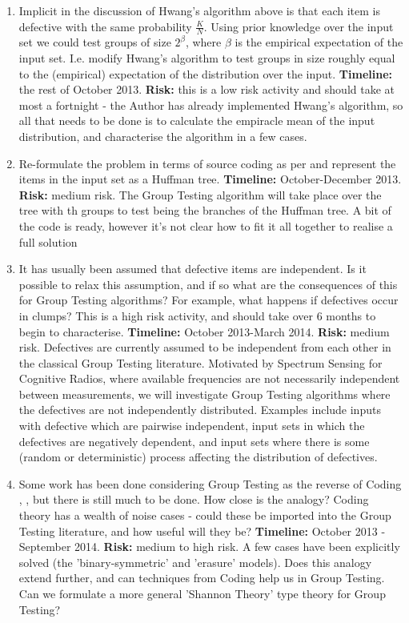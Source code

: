 \documentclass[12pt, a4paper]{article}
\begin{document}
\begin{enumerate}
\item Implicit in the discussion of Hwang's algorithm above is that each item is defective with the same probability \( \frac{K}{N} \). Using prior knowledge over the input set we could test groups of size \(2^\beta\), where \(\beta\) is the empirical expectation of the input set. I.e. modify Hwang's algorithm to test groups in size roughly equal to the (empirical) expectation of the distribution over the input. \textbf{Timeline:} the rest of October 2013. \textbf{Risk: } this is a low risk activity and should take at most a fortnight - the Author has already implemented Hwang's algorithm, so all that needs to be done is to calculate the empiracle mean of the input distribution, and characterise the algorithm in a few cases.

\item Re-formulate the problem in terms of source coding as per \cite{Aldroubi} and represent the items in the input set as a Huffman tree. \textbf{Timeline:} October-December 2013. \textbf{Risk: } medium risk. The Group Testing algorithm will take place over the tree with th groups to test being the branches of the Huffman tree. A bit of the code is ready, however it's not clear how to fit it all together to realise a full solution

\item It has usually been assumed that defective items are independent. Is it possible to relax this assumption, and if so what are the consequences of this for Group Testing algorithms? For example, what happens if defectives occur in clumps? This is a high risk activity, and should take over 6 months to begin to characterise. \textbf{Timeline: }
October 2013-March 2014. \textbf{Risk: } medium risk. Defectives are currently assumed to be independent from each other in the classical Group Testing literature. Motivated by Spectrum Sensing for Cognitive Radios, where available frequencies are not necessarily independent between measurements, we will investigate Group Testing algorithms where the defectives are not independently distributed. Examples include inputs with defective which are pairwise independent, input sets in which the defectives are negatively dependent, and input sets where there is some (random or deterministic) process affecting the distribution of defectives.

\item Some work has been done considering Group Testing as the reverse of Coding \cite{Wadayama2013}, \cite{Sejdinovic2010}, but there is still much to be done. How close is the analogy? Coding theory has a wealth of noise cases - could these be imported into the Group Testing literature, and how useful will they be? \textbf{Timeline: } October 2013 - September 2014. \textbf{Risk: } medium to high risk. A few cases have been explicitly solved (the 'binary-symmetric' and 'erasure' models). Does this analogy extend further, and can techniques from Coding help us in Group Testing. Can we formulate a more general 'Shannon Theory' type theory for Group Testing?


\end{enumerate}
\end{document}
